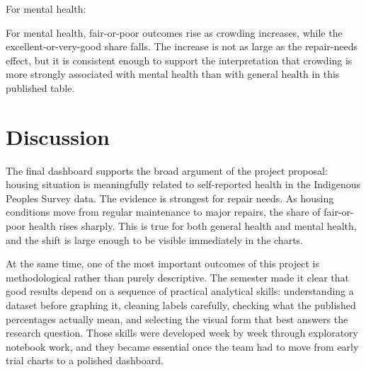 \documentclass[conference]{IEEEtran}
\begin{document}
For mental health:

\begin{table}[htbp]
\caption{Mental health composition by crowding level}
\label{tab:mental_crowding}
\centering
{}
\end{table}

For mental health, fair-or-poor outcomes rise as crowding increases, while the excellent-or-very-good share falls. The increase is not as large as the repair-needs effect, but it is consistent enough to support the interpretation that crowding is more strongly associated with mental health than with general health in this published table.

\section{Discussion}

The final dashboard supports the broad argument of the project proposal: housing situation is meaningfully related to self-reported health in the Indigenous Peoples Survey data. The evidence is strongest for repair needs. As housing conditions move from regular maintenance to major repairs, the share of fair-or-poor health rises sharply. This is true for both general health and mental health, and the shift is large enough to be visible immediately in the charts.

At the same time, one of the most important outcomes of this project is methodological rather than purely descriptive. The semester made it clear that good results depend on a sequence of practical analytical skills: understanding a dataset before graphing it, cleaning labels carefully, checking what the published percentages actually mean, and selecting the visual form that best answers the research question. Those skills were developed week by week through exploratory notebook work, and they became essential once the team had to move from early trial charts to a polished dashboard.
\end{document}
